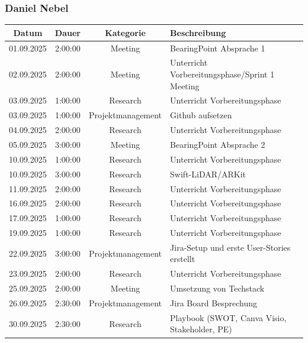 \documentclass{article}
\begin{document}
\subsubsection*{Daniel Nebel}
\begin{table}[H]
  \centering
  \begin{tabularx}{\textwidth}{|c|c|c|X|}
    \hline
    \rowcolor{black!10}\textbf{Datum} & \textbf{Dauer} & \textbf{Kategorie} & \textbf{Beschreibung} \\
    \hline
    01.09.2025 & 2:00:00 & Meeting           & BearingPoint Absprache 1 \\ \hline
    02.09.2025 & 2:00:00 & Meeting           & Unterricht Vorbereitungsphase/Sprint 1 Meeting \\ \hline
    03.09.2025 & 1:00:00 & Research          & Unterricht Vorbereitungsphase \\ \hline
    03.09.2025 & 1:00:00 & Projektmanagement & Github aufsetzen \\ \hline
    04.09.2025 & 2:00:00 & Research          & Unterricht Vorbereitungsphase \\ \hline
    05.09.2025 & 3:00:00 & Meeting           & BearingPoint Absprache 2 \\ \hline
    10.09.2025 & 1:00:00 & Research          & Unterricht Vorbereitungsphase \\ \hline
    10.09.2025 & 3:00:00 & Research          & Swift-LiDAR/ARKit \\ \hline
    11.09.2025 & 2:00:00 & Research          & Unterricht Vorbereitungsphase \\ \hline
    16.09.2025 & 2:00:00 & Research          & Unterricht Vorbereitungsphase \\ \hline
    17.09.2025 & 1:00:00 & Research          & Unterricht Vorbereitungsphase \\ \hline
    19.09.2025 & 1:00:00 & Research          & Unterricht Vorbereitungsphase \\ \hline
    22.09.2025 & 3:00:00 & Projektmanagement & Jira-Setup und erste User-Stories erstellt \\ \hline
    23.09.2025 & 2:00:00 & Research          & Unterricht Vorbereitungsphase \\ \hline
    25.09.2025 & 2:00:00 & Meeting           & Umsetzung von Techstack \\ \hline
    26.09.2025 & 2:30:00 & Projektmanagement & Jira Board Besprechung \\ \hline
    30.09.2025 & 2:30:00 & Research          & Playbook (SWOT, Canva Visio, Stakeholder, PE) \\ \hline

\end{tabularx}
\end{table}
\end{document}
